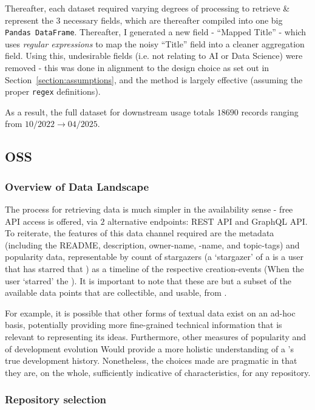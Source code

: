 Thereafter, each dataset required varying degrees of processing to retrieve \& represent the $3$ necessary fields, which are thereafter compiled into one big \texttt{Pandas DataFrame}.
Thereafter, I generated a new field - ``Mapped Title'' - which uses \emph{regular expressions} to map the noisy ``Title'' field into a cleaner aggregation field.
Using this, undesirable fields (i.e. not relating to AI or Data Science) were removed - this was done in alignment to the design choice as set out in Section~\ref{section:assumptions}, and the method is largely effective (assuming the proper \texttt{regex} definitions).

As a result, the full \jobposts{} dataset for downstream usage totals $18690$ records ranging from $10/2022 \rightarrow 04/2025$.

\subsection{OSS \repos{}}

\subsubsection{Overview of Data Landscape}

The process for retrieving \ghrepos{} data is much simpler in the availability sense - free API access is offered, via $2$ alternative endpoints: REST API and GraphQL API.
To reiterate, the features of this data channel required are the \repo{} metadata (including the README, description, owner-name, \repo{}-name, and topic-tags) and popularity data, representable by count of stargazers (a `stargazer' of a \repo{} is a user that has starred that \repo{}) as a timeline of the respective creation-events (When the user `starred' the \repo{}).
It is important to note that these are but a subset of the available data points that are collectible, and usable, from \gh{}.

For example, it is possible that other forms of textual data exist on an ad-hoc basis, potentially providing more fine-grained technical information that is relevant to representing its ideas. Furthermore, other measures of popularity and of development evolution Would provide a more holistic understanding of a \repo{}'s true development history.
Nonetheless, the choices made are pragmatic in that they are, on the whole, sufficiently indicative of \repo{} characteristics, for any repository.

\subsubsection{Repository selection}

